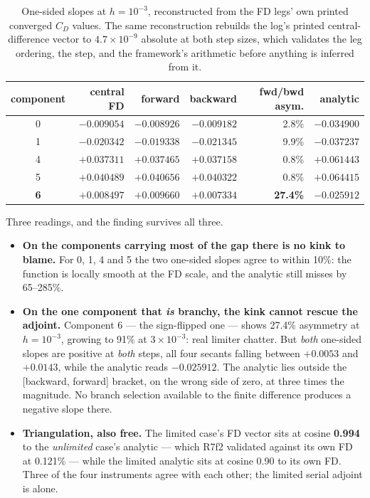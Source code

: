 \documentclass[11pt,a4paper]{article}
\begin{document}
\begin{table}[htbp]
\centering\small
\begin{tabular}{@{}crrrrr@{}}
\toprule
component & central FD & forward & backward & fwd/bwd asym. & analytic \\
\midrule
0 & \(-0.009054\) & \(-0.008926\) & \(-0.009182\) & 2.8\% & \(\mathbf{-0.034900}\) \\
1 & \(-0.020342\) & \(-0.019338\) & \(-0.021345\) & 9.9\% & \(\mathbf{-0.037237}\) \\
4 & \(+0.037311\) & \(+0.037465\) & \(+0.037158\) & 0.8\% & \(\mathbf{+0.061443}\) \\
5 & \(+0.040489\) & \(+0.040656\) & \(+0.040322\) & 0.8\% & \(\mathbf{+0.064415}\) \\
\textbf{6} & \(+0.008497\) & \(\mathbf{+0.009660}\) & \(\mathbf{+0.007334}\) & \textbf{27.4\%} & \(\mathbf{-0.025912}\) \\
\bottomrule
\end{tabular}
\caption{One-sided slopes at \(h=10^{-3}\), reconstructed from the FD legs' own printed
converged \(C_D\) values. The same reconstruction rebuilds the log's printed central-difference
vector to \(4.7\times10^{-9}\) absolute at both step sizes, which validates the leg ordering,
the step, and the framework's arithmetic before anything is inferred from it.}
\label{tab:onesided}
\end{table}

Three readings, and the finding survives all three.

\begin{itemize}
\item \textbf{On the components carrying most of the gap there is no kink to blame.} For
0, 1, 4 and 5 the two one-sided slopes agree to within 10\%: the function is locally smooth at
the FD scale, and the analytic still misses by 65--285\%.
\item \textbf{On the one component that \emph{is} branchy, the kink cannot rescue the
adjoint.} Component 6 --- the sign-flipped one --- shows 27.4\% asymmetry at \(h=10^{-3}\),
growing to 91\% at \(3\times10^{-3}\): real limiter chatter. But \emph{both} one-sided slopes
are positive at \emph{both} steps, all four secants falling between \(+0.0053\) and
\(+0.0143\), while the analytic reads \(-0.025912\). The analytic lies outside the
[backward, forward] bracket, on the wrong side of zero, at three times the magnitude. No
branch selection available to the finite difference produces a negative slope there.
\item \textbf{Triangulation, also free.} The limited case's FD vector sits at cosine
\textbf{0.994} to the \emph{unlimited} case's analytic --- which R7f2 validated against its own
FD at 0.121\% --- while the limited analytic sits at cosine 0.90 to its own FD. Three of the
four instruments agree with each other; the limited serial adjoint is alone.
\end{itemize}
\end{document}
